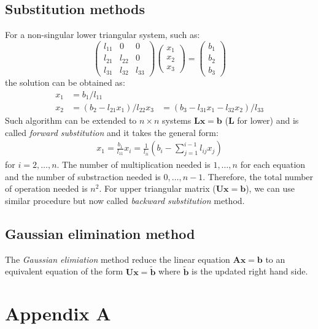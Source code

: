 \documentclass{article}
\begin{document}
\subsection{Substitution methods}
For a non-singular lower triangular system, such as:
\begin{equation}
    \left(\begin{matrix}
        l_{11} & 0 & 0 \\
        l_{21} & l_{22} & 0 \\
        l_{31} & l_{32} & l_{33} 
    \end{matrix}\right)
    \left(\begin{matrix}
        x_1 \\ x_2 \\ x_3
    \end{matrix}\right) = 
    \left(\begin{matrix}
        b_1 \\ b_2 \\ b_3
    \end{matrix}\right)
\end{equation}
the solution can be obtained as:
\begin{align*}
    x_1 &= b_1 / l_{11} \\
    x_2 &= (b_2 - l_{21} x_1 ) / l_{22} 
    x_3 &= (b_3 - l_{31} x_1 - l_{32} x_2) / l_{33}
\end{align*}
Such algorithm can be extended to $n\times n$ systems 
$\mathbf{L}\mathbf{x} = \mathbf{b}$ ($\mathbf{L}$ for lower)
and is called \emph{forward substitution}
and it takes the general form:
\begin{align*}
    x_1 = \frac{b_1}{l_{11}}
    x_i = \frac{1}{l_{ii}} \left(b_i - \sum_{j = 1}^{i-1} l_{ij}x_j\right) 
\end{align*}
for $i = 2, \dots, n$. The number of multiplication needed is $1, \dots, n$ for each 
equation and the number of substraction needed is $0, \dots, n-1$. Therefore, the total 
number of operation needed is $n^2$. 
For upper triangular matrix ($\mathbf{U}\mathbf{x} = \mathbf{b}$), we can use similar procedure but now called 
\emph{backward substitution} method.

\subsection{Gaussian elimination method}
The \emph{Gaussian elimiation} method reduce the linear equation 
$\mathbf{A}\mathbf{x} = \mathbf{b}$ to an equivalent equation 
of the form $\mathbf{U}\mathbf{x} = \tilde{\mathbf{b}}$ where $\tilde{\mathbf{b}}$
is the updated right hand side.


\pagebreak
\section*{Appendix A}
\end{document}
